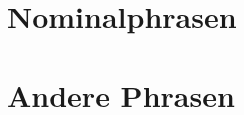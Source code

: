 \documentclass[handout,aspectratio=1610,dvipsnames]{beamer}
\begin{document}
  \section[Nominalphrasen]{Nominalphrasen}
  \let\woopsi\section\let\section\subsection\let\subsection\subsubsection
  
  \let\subsection\section\let\section\woopsi

  \section[Phrasen]{Andere Phrasen}
  \let\woopsi\section\let\section\subsection\let\subsection\subsubsection
  
  \let\subsection\section\let\section\woopsi
\end{document}

